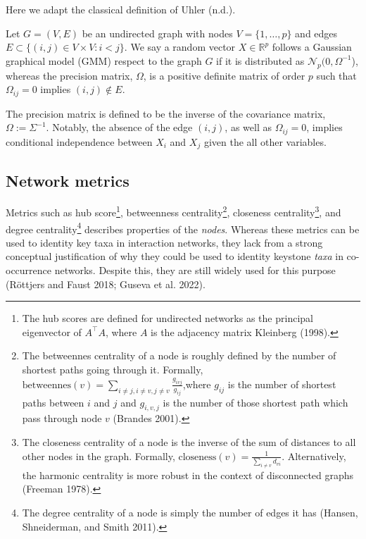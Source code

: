 \documentclass[
  letterpaper,
  DIV=11,
  numbers=noendperiod]{scrartcl}
\begin{document}
Here we adapt the classical definition of Uhler (n.d.).

Let \(G = (V, E)\) be an undirected graph with nodes
\(V=\{1, \dots, p\}\) and edges
\(E \subset \{(i, j) \in V\times V : i<j\}\). We say a random vector
\(X\in\mathbb R^p\) follows a Gaussian graphical model (GMM) respect to
the graph \(G\) if it is distributed as
\(\mathcal N_p(0, \Omega ^{-1}\)), whereas the precision matrix,
\(\Omega\), is a positive definite matrix of order \(p\) such that
\(\Omega_{ij} = 0\) implies \((i, j) \notin E\).

The precision matrix is defined to be the inverse of the covariance
matrix, \(\Omega :=\Sigma^{-1}\). Notably, the absence of the edge
\((i, j)\), as well as \(\Omega_{ij}=0\), implies conditional
independence between \(X_i\) and \(X_j\) given the all other variables.

\hypertarget{network-metrics}{%
\subsection{Network metrics}\label{network-metrics}}

Metrics such as hub score\footnote{The hub scores are defined for
  undirected networks as the principal eigenvector of \(A^\top A\),
  where \(A\) is the adjacency matrix Kleinberg (1998).}, betweenness
centrality\footnote{The betweennes centrality of a node is roughly
  defined by the number of shortest paths going through it. Formally,
  \(\text{betweennes}(v) = \sum_{i\ne j, i\ne v, j\ne v} \frac{g_{ivj}}{g_{ij}}\),where
  \(g_{ij}\) is the number of shortest paths between \(i\) and \(j\) and
  \(g_{i, v, j}\) is the number of those shortest path which pass
  through node \(v\) (Brandes 2001).}, closeness centrality\footnote{The
  closeness centrality of a node is the inverse of the sum of distances
  to all other nodes in the graph. Formally,
  \(\text{closeness}(v) = \frac{1}{\sum_{i\ne v}d_{vi}}\).
  Alternatively, the harmonic centrality is more robust in the context
  of disconnected graphs (Freeman 1978).}, and degree
centrality\footnote{The degree centrality of a node is simply the number
  of edges it has (Hansen, Shneiderman, and Smith 2011).} describes
properties of the \emph{nodes}. Whereas these metrics can be used to
identity key taxa in interaction networks, they lack from a strong
conceptual justification of why they could be used to identity keystone
\emph{taxa} in co-occurrence networks. Despite this, they are still
widely used for this purpose (Röttjers and Faust 2018; Guseva et al.
2022).
\end{document}
